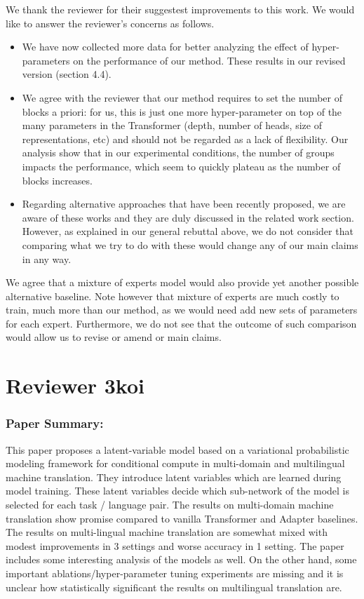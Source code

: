 \documentclass[12pt,times,a4paper,twoside]{article}
\theoremstyle{definition}
\begin{document}
{\color{blue}
We thank the reviewer for their suggestest improvements to this work. We would like to answer the reviewer's concerns as follows.

\begin{itemize}
\item %
  We have now collected more data for better analyzing the effect of hyper-parameters on the performance of our method. These results in our revised version (section 4.4).
  
\item We agree with the reviewer that our method requires to set the number of blocks a priori: for us, this is just one more hyper-parameter on top of the many parameters in the Transformer (depth, number of heads, size of representations, etc) and should not be regarded as a lack of flexibility. Our analysis show that in our experimental conditions, the number of groups impacts the performance, which seem to quickly plateau as the number of blocks increases.
  
\item Regarding alternative approaches that have been recently proposed, we are aware of these works and they are duly discussed in the related work section. However, as explained in our general rebuttal above, we do not consider that comparing what we try to do with these would change any of our main claims in any way.\done{}
\end{itemize}

We agree that a mixture of experts model would also provide yet another possible alternative baseline. Note however that mixture of experts are much costly to train, much more than our method, as we would need add new sets of parameters for each expert. Furthermore, we do not see that the outcome of such comparison would allow us to revise or amend or main claims.
}
\section*{Reviewer 3koi}

\subsubsection*{Paper Summary:}

This paper proposes a latent-variable model based on a variational probabilistic modeling framework for conditional compute in multi-domain and multilingual machine translation. They introduce latent variables which are learned during model training. These latent variables decide which sub-network of the model is selected for each task / language pair. The results on multi-domain machine translation show promise compared to vanilla Transformer and Adapter baselines. The results on multi-lingual machine translation are somewhat mixed with modest improvements in 3 settings and worse accuracy in 1 setting. The paper includes some interesting analysis of the models as well. On the other hand, some important ablations/hyper-parameter tuning experiments are missing and it is unclear how statistically significant the results on multilingual translation are.
\end{document}
